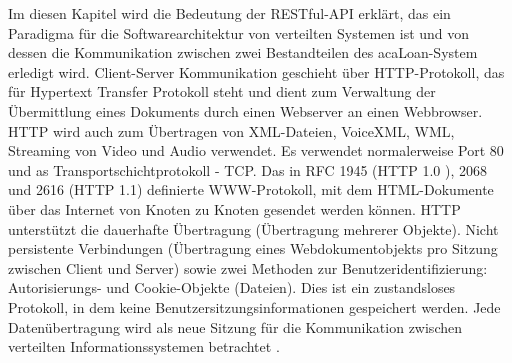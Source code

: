 Im diesen Kapitel wird die Bedeutung der RESTful-API erklärt, das ein Paradigma für die Softwarearchitektur von verteilten Systemen ist und von dessen die Kommunikation zwischen zwei Bestandteilen des acaLoan-System erledigt wird. Client-Server Kommunikation geschieht über HTTP-Protokoll, das für Hypertext Transfer Protokoll steht und dient zum Verwaltung der Übermittlung eines Dokuments durch einen Webserver an einen Webbrowser. HTTP wird auch zum Übertragen von XML-Dateien, VoiceXML, WML, Streaming von Video und Audio verwendet. Es verwendet normalerweise Port 80 und as Transportschichtprotokoll - TCP. Das in RFC 1945 (HTTP 1.0 \cite{website:httprfc1945}), 2068 \cite{website:httprfc2068} und 2616 (HTTP 1.1) definierte WWW-Protokoll, mit dem HTML-Dokumente über das Internet von Knoten zu Knoten gesendet werden können. HTTP unterstützt die dauerhafte Übertragung (Übertragung mehrerer Objekte). Nicht persistente Verbindungen (Übertragung eines Webdokumentobjekts pro Sitzung zwischen Client und Server) sowie zwei Methoden zur Benutzeridentifizierung: Autorisierungs- und Cookie-Objekte (Dateien). Dies ist ein zustandsloses Protokoll, in dem keine Benutzersitzungsinformationen gespeichert werden. Jede Datenübertragung wird als neue Sitzung für die Kommunikation zwischen verteilten Informationssystemen betrachtet \cite[p.62]{shklar:webapplication}.


